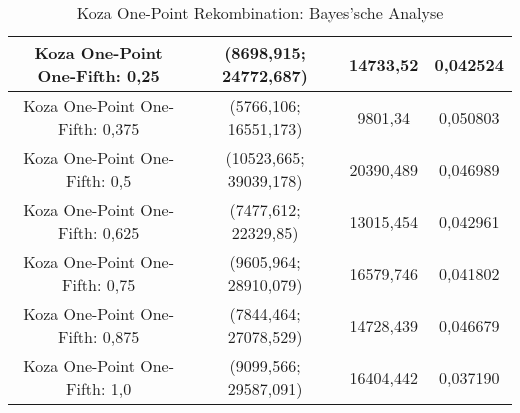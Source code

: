 \begin{table}[H]
\begin{tabular}{c | c | c | c}
		Koza One-Point One-Fifth: 0,25 & (8698,915; 24772,687) & 14733,52 & 0,042524\\
		\hline
		Koza One-Point One-Fifth: 0,375 & (5766,106; 16551,173) & 9801,34 & 0,050803 \\
		\hline
		Koza One-Point One-Fifth: 0,5 & (10523,665; 39039,178) & 20390,489 & 0,046989\\
		\hline
		Koza One-Point One-Fifth: 0,625 & (7477,612; 22329,85) & 13015,454 & 0,042961\\
		\hline
		Koza One-Point One-Fifth: 0,75 & (9605,964; 28910,079) & 16579,746 & 0,041802\\
		\hline
		Koza One-Point One-Fifth: 0,875 & (7844,464; 27078,529) & 14728,439 & 0,046679\\
		\hline
		Koza One-Point One-Fifth: 1,0 & (9099,566; 29587,091) & 16404,442 & 0,037190\\
	\end{tabular}
	\caption{Koza One-Point Rekombination: Bayes'sche Analyse}
	\label{table:kozaOnePointBayesian}
\end{table}

